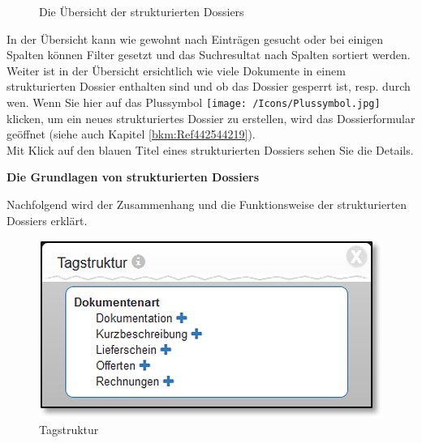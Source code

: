 
\begin{figure}[H]
  \vspace{-25pt}
\caption{Die Übersicht der strukturierten Dossiers}
\end{figure}

In der Übersicht kann wie gewohnt nach Einträgen gesucht oder bei einigen Spalten können Filter gesetzt und das Suchresultat nach Spalten sortiert werden. Weiter ist in der Übersicht ersichtlich wie viele Dokumente in einem strukturierten Dossier enthalten sind und ob das Dossier gesperrt ist, resp. durch wen. Wenn Sie hier auf das Plussymbol \texttt{[image: /Icons/Plussymbol.jpg]} klicken, um ein neues strukturiertes Dossier zu erstellen, wird das Dossierformular geöffnet (siehe auch Kapitel \ref{bkm:Ref442544219}).\\

Mit Klick auf den blauen Titel eines strukturierten Dossiers sehen Sie die Details.

\vspace{\baselineskip}

\textbf{Die Grundlagen von strukturierten Dossiers}

Nachfolgend wird der Zusammenhang und die Funktionsweise der strukturierten Dossiers erklärt.

\begin{figure}
  \vspace{-20pt}
  \begin{center}
    \includegraphics[width=1\linewidth]{../chapters/11_Dokumentenablage/pictures/plandos_TagTyp.jpg}
  \end{center}
  \vspace{-20pt}
  \caption{Tagstruktur}
  \vspace{-10pt}
\end{figure}

